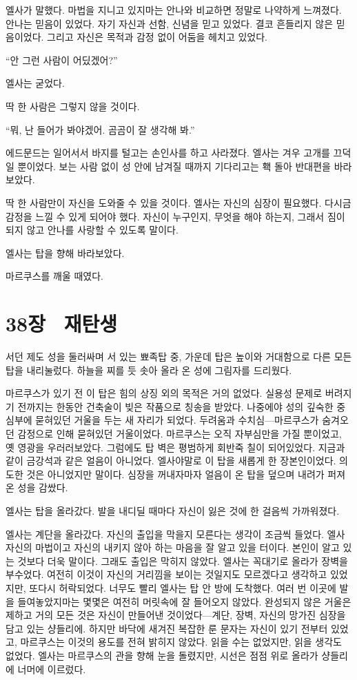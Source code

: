 엘사가 말했다. 마법을 지니고 있지마는 안나와 비교하면 정말로 나약하게 느껴졌다. 안나는 믿음이 있었다. 자기 자신과 선함, 신념을 믿고 있었다. 결코 흔들리지 않은 믿음이었다. 그리고 자신은 목적과 감정 없이 어둠을 헤치고 있었다.

``안 그런 사람이 어딨겠어?''

엘사는 굳었다.

딱 한 사람은 그렇지 않을 것이다.

``뭐, 난 들어가 봐야겠어. 곰곰이 잘 생각해 봐.''

에드문드는 일어서서 바지를 털고는 손인사를 하고 사라졌다. 엘사는 겨우 고개를 끄덕일 뿐이었다. 보는 사람 없이 성 안에 남겨질 때까지 기다리고는 홱 돌아 반대편을 바라보았다.

딱 한 사람만이 자신을 도와줄 수 있을 것이다. 엘사는 자신의 심장이 필요했다. 다시금 감정을 느낄 수 있게 되어야 했다. 자신이 누구인지, 무엇을 해야 하는지, 그래서 짐이 되지 않고 안나를 사랑할 수 있도록 말이다.

엘사는 탑을 향해 바라보았다.

마르쿠스를 깨울 때였다.



\chapter[38장  재탄생][38장\hspace*{.5em}재탄생]{38장 \ 재탄생}



서던 제도 성을 둘러싸며 서 있는 뾰족탑 중, 가운데 탑은 높이와 거대함으로 다른 모든 탑을 내리눌렀다. 하늘을 찌를 듯 솟아 올라 온 성에 그림자를 드리웠다.

마르쿠스가 있기 전 이 탑은 힘의 상징 외의 목적은 거의 없었다. 실용성 문제로 버려지기 전까지는 한동안 건축술이 빚은 작품으로 칭송을 받았다. 나중에야 성의 깊숙한 중심부에 묻혀있던 거울을 두는 새 자리가 되었다. 두려움과 수치심—마르쿠스가 숨겨오던 감정으로 인해 묻혀있던 거울이었다. 마르쿠스는 오직 자부심만을 가질 뿐이었고, 옛 영광을 우러러보았다. 그럼에도 탑 벽은 평범하게 회반죽 칠이 되어있었다. 지금과 같이 금강석과 같은 얼음이 아니었다. 엘사야말로 이 탑을 새롭게 한 장본인이었다. 의도한 것은 아니었지만 말이다. 심장을 꺼내자마자 얼음이 온 탑을 덮으며 내려가 퍼져 온 성을 감쌌다.

엘사는 탑을 올라갔다. 발을 내디딜 때마다 자신이 잃은 것에 한 걸음씩 가까워졌다.

엘사는 계단을 올라갔다. 자신의 출입을 막을지 모른다는 생각이 조금씩 들었다. 엘사 자신의 마법이고 자신의 내키지 않아 하는 마음을 잘 알고 있을 터이다. 본인이 알고 있는 것보다 더욱 말이다. 그래도 출입은 막히지 않았다. 엘사는 꼭대기로 올라가 장벽을 부수었다. 여전히 이것이 자신의 거리낌을 보이는 것일지도 모르겠다고 생각하고 있었지만, 또다시 허락되었다. 너무도 빨리 엘사는 탑 안 방에 도착했다. 여러 번 이곳에 발을 들여놓았지마는 몇몇은 여전히 머릿속에 잘 들어오지 않았다. 완성되지 않은 거울은 제하고 거의 모든 것은 자신이 만들어낸 것이었다—계단, 장벽, 자신의 망가진 심장을 담고 있는 샹들리에. 하지만 바닥에 새겨진 복잡한 룬 문자는 자신이 있기 전부터 있었고, 마르쿠스는 이것의 용도를 전혀 밝히지 않았다. 읽을 수는 없었지만, 읽을 생각도 없었다. 엘사는 마르쿠스의 관을 향해 눈을 돌렸지만, 시선은 점점 위로 올라가 샹들리에 너머에 이르렀다.

